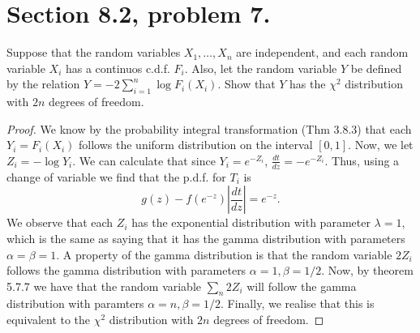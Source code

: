 \documentclass{article}
\newcommand{\randsamp}{X_1,\dots,X_n}
\newcommand{\pdf}{p.d.f. }
\newcommand{\cdf}{c.d.f. }
\newenvironment{hwproof}[1]
{
    #1
    \begin{proof}
}{
    \end{proof}
}
\begin{document}
\section{Section 8.2, problem 7.}
\begin{hwproof}
    {
        Suppose that the random variables $\randsamp$ are independent,
        and each random variable $X_i$ has a continuos \cdf $F_i$. Also, let the
        random variable $Y$ be defined by the relation
        $Y = -2\sum_{i=1}^n \log F_i(X_i)$. Show that $Y$ has the $\chi^2$
        distribution with $2n$ degrees of freedom.
    }

    We know by the probability integral transformation (Thm 3.8.3) that each
    $Y_i = F_i(X_i)$ follows the uniform distribution on the interval $[0,1]$.
    Now, we let $Z_i = -\log{Y_i}$. We can calculate that since
    $Y_i = e^{-Z_i}$, $\frac{dt}{dz} = - e^{-Z_i}$. Thus, using a change of
    variable we find that the \pdf for $T_i$ is
    \begin{equation*}
        g(z) - f(e^{-z}) |\frac{dt}{dz}| = e^{-z}.
    \end{equation*}
    We observe that each $Z_i$ has the exponential distribution with parameter
    $\lambda = 1$, which is the same as saying that it has the gamma distribution
    with parameters $\alpha = \beta = 1$. A property of the gamma distribution is
    that the random variable $2Z_i$ follows the gamma distribution with
    parameters $\alpha = 1, \beta = 1/2$. Now, by theorem 5.7.7 we have that
    the random variable $\sum_n 2Z_i$ will follow the gamma distribution with
    paramters $\alpha = n, \beta = 1/2$. Finally, we realise that this is
    equivalent to the $\chi^2$ distribution with $2n$ degrees of freedom.
\end{hwproof}
\end{document}

